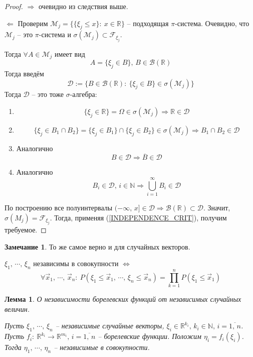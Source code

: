 \documentclass[a4paper,12pt]{article}
\renewcommand{\leq}{\ensuremath{\leqslant}}
\theoremstyle{plain}
\newtheorem{lemma}{Лемма}[section]
\theoremstyle{definition}
\newtheorem*{note}{Замечание}
\theoremstyle{remark}
\begin{document}
\begin{proof}
	$\Rightarrow$ очевидно из следствия выше.

	$\Leftarrow$ Проверим $\mathcal{M}_j = \{\{\xi_j \leq x\}:\: x \in \mathbb{R}\}$ -- подходящая $\pi$-система. Очевидно, что $\mathcal{M}_j$ -- это $\pi$-система и $\sigma(\mathcal{M}_j) \subset \mathcal{F}_{\xi_j}$.

	Тогда $\forall A \in \mathcal{M}_j$ имеет вид
	\[A = \{\xi_j \in B\},\, B \in \mathcal{B}(\mathbb{R})\]
	Тогда введём
	\[\mathcal{D} := \{B \in \mathcal{B}(\mathbb{R}) :\: \{\xi_j \in B\} \in \sigma(\mathcal{M}_j)\}\]
	Тогда $\mathcal{D}$ -- это тоже $\sigma$-алгебра:
	\begin{enumerate}
		\item \[\{\xi_j \in \mathbb{R}\} = \Omega \in \sigma(\mathcal{M}_j) \Rightarrow \mathbb{R} \in \mathcal{D}\]
		\item \[\{\xi_j \in B_1 \cap B_2\} = \{\xi_j \in B_1\} \cap \{\xi_j \in B_2\} \in \sigma(\mathcal{M}_j) \Rightarrow B_1 \cap B_2 \in \mathcal{D}\]
		\item Аналогично
		      \[B \in \mathcal{D} \Rightarrow \overline{B} \in \mathcal{D}\]
		\item Аналогично
		      \[B_i \in \mathcal{D},\, i \in \mathbb{N} \Rightarrow \bigcup_{i = 1}^\infty B_i \in \mathcal{D}\]
	\end{enumerate}
	По построению все полуинтервалы $(-\infty,\, x] \in \mathcal{D} \Rightarrow \mathcal{B}(\mathbb{R}) \subset \mathcal{D}$. Значит, $\sigma(M_j) = \mathcal{F}_{\xi_j}$. Тогда, применяя (\ref{INDEPENDENCE_CRIT}), получим требуемое.
\end{proof}

\begin{note}
	То же самое верно и для случайных векторов.

	$\xi_1,\,\cdots,\,\xi_n$ независимы в совокупности $\Leftrightarrow$
	\[\forall \vec{x}_1,\,\cdots,\,\vec{x}_n :\: P(\xi_1 \leq \vec{x}_1,\,\cdots,\,\xi_n \leq \vec{x}_n) = \prod_{k = 1}^n P(\xi_1 \leq \vec{x}_1)\]
\end{note}

\begin{lemma}
	О независимости борелевских функций от независимых случайных величин.

	Пусть $\xi_1,\,\cdots,\,\xi_n$ -- независимые случайные векторы, $\xi_i \in \mathbb{R}^{k_i},\, k_i \in \mathbb{N},\, i = \overline{1,\,n}$. Пусть $f_i:\: \mathbb{R}^{k_i} \to \mathbb{R}^{m_i},\, i = \overline{1,\,n}$ -- борелевские функции. Положим $\eta_i = f_i(\xi_i)$. Тогда $\eta_1,\,\cdots,\,\eta_n$ -- независимые в совокупности.
\end{lemma}
\end{document}
